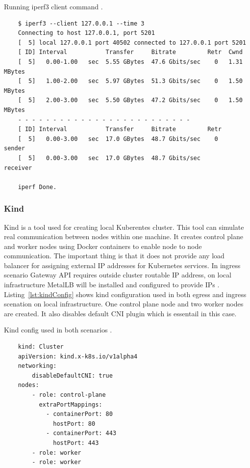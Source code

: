 \begin{listing}[H]
    \centering
    \caption{Running iperf3 client command \cite{IperfDocs}.}
    \begin{verbatim}
    $ iperf3 --client 127.0.0.1 --time 3
    Connecting to host 127.0.0.1, port 5201
    [  5] local 127.0.0.1 port 40502 connected to 127.0.0.1 port 5201
    [ ID] Interval           Transfer     Bitrate         Retr  Cwnd
    [  5]   0.00-1.00   sec  5.55 GBytes  47.6 Gbits/sec    0   1.31 MBytes       
    [  5]   1.00-2.00   sec  5.97 GBytes  51.3 Gbits/sec    0   1.50 MBytes       
    [  5]   2.00-3.00   sec  5.50 GBytes  47.2 Gbits/sec    0   1.50 MBytes       
    - - - - - - - - - - - - - - - - - - - - - - - - -
    [ ID] Interval           Transfer     Bitrate         Retr
    [  5]   0.00-3.00   sec  17.0 GBytes  48.7 Gbits/sec    0             sender
    [  5]   0.00-3.00   sec  17.0 GBytes  48.7 Gbits/sec                  receiver

    iperf Done.
    \end{verbatim}
    \label{lst:iperfClient}
\end{listing}

\subsubsection{Kind}
\label{sec:kind}

Kind is a tool used for creating local Kuberentes cluster. This tool can simulate real communication between nodes within one machine. It creates control plane and worker nodes using Docker containers to enable node to node communication. The important thing is that it does not provide any load balancer for assigning external IP addresses for Kubernetes services. In ingress scenario Gateway API requires outside cluster routable IP address, on local infrastructure MetalLB will be installed and configured to provide IPs \cite{Kind}. Listing~\ref{lst:kindConfig} shows kind configuration used in both egress and ingress scenation on local infrastructure. One control plane node and two worker nodes are created. It also disables default CNI plugin which is essentail in this case.

\begin{listing}[H]
    \centering
    \caption{Kind config used in both scenarios \cite{KindConfig}.}
    \begin{verbatim}
    kind: Cluster
    apiVersion: kind.x-k8s.io/v1alpha4
    networking:
        disableDefaultCNI: true
    nodes:
        - role: control-plane
          extraPortMappings:
            - containerPort: 80
              hostPort: 80
            - containerPort: 443
              hostPort: 443
        - role: worker
        - role: worker
    \end{verbatim}
    \label{lst:kindConfig}
\end{listing}

